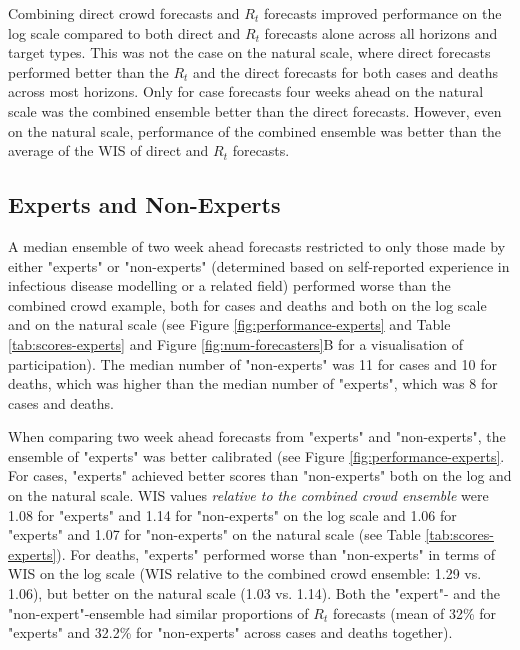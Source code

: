 \documentclass[10pt,a4paper,twocolumn]{article}
\begin{document}
Combining direct crowd forecasts and $R_t$ forecasts improved performance on the log scale compared to both direct and $R_t$ forecasts alone across all horizons and target types. This was not the case on the natural scale, where direct forecasts performed better than the $R_t$ and the direct forecasts for both cases and deaths across most horizons. Only for case forecasts four weeks ahead on the natural scale was the combined ensemble better than the direct forecasts. However, even on the natural scale, performance of the combined ensemble was better than the average of the WIS of direct and $R_t$ forecasts. 





\subsection*{Experts and Non-Experts}


A median ensemble of two week ahead forecasts restricted to only those made by either "experts" or "non-experts" (determined based on self-reported experience in infectious disease modelling or a related field) performed worse than the combined crowd example, both for cases and deaths and both on the log scale and on the natural scale (see Figure \ref{fig:performance-experts} and Table \ref{tab:scores-experts} and Figure \ref{fig:num-forecasters}B for a visualisation of participation). The median number of "non-experts" was 11 for cases and 10 for deaths, which was higher than the median number of "experts", which was 8 for cases and deaths. 

When comparing two week ahead forecasts from "experts" and "non-experts", the ensemble of "experts" was better calibrated (see Figure \ref{fig:performance-experts}. For cases, "experts" achieved better scores than "non-experts" both on the log and on the natural scale. WIS values \textit{relative to the combined crowd ensemble} were 1.08 for "experts" and 1.14 for "non-experts" on the log scale and 1.06 for "experts" and 1.07 for "non-experts" on the natural scale (see Table \ref{tab:scores-experts}).  
For deaths, "experts" performed worse than "non-experts" in terms of WIS on the log scale (WIS relative to the combined crowd ensemble: 1.29 vs. 1.06), but better on the natural scale (1.03 vs. 1.14). Both the "expert"- and the "non-expert"-ensemble had similar proportions of $R_t$ forecasts (mean of 32\% for "experts" and 32.2\% for "non-experts" across cases and deaths together). 
\end{document}
